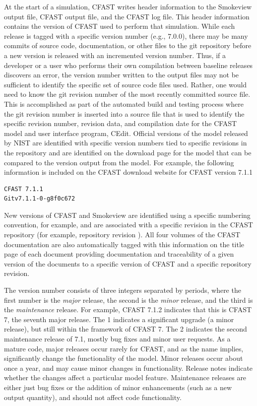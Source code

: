 \documentclass[12pt]{book}
\begin{document}
At the start of a simulation, CFAST writes header information to the Smokeview output file, CFAST output file, and the CFAST log file.  This header information contains the version of CFAST used to perform that simulation. While each release is tagged with a specific version number (e.g., 7.0.0), there may be many commits of source code, documentation, or other files to the git repository before a new version is released with an incremented version number.  Thus, if a developer or a user who performs their own compilation between baseline releases discovers an error, the version number written to the output files may not be sufficient to identify the specific set of source code files used.  Rather, one would need to know the git revision number of the most recently committed source file. This is accomplished as part of the automated build and testing process where the git revision number is inserted into a source file that is used to identify the specific revision number, revision data, and compilation date for the CFAST model and user interface program, CEdit. Official versions of the model released by NIST are identified with specific version numbers tied to specific revisions in the repository and are identified on the download page for the model that can be compared to the version output from the model. For example, the following information is included on the CFAST download website for CFAST version 7.1.1

\begin{lstlisting}
CFAST 7.1.1
Gitv7.1.1-0-g8f0c672
\end{lstlisting}

New versions of CFAST and Smokeview are identified using a specific numbering convention, for example,  and are associated with a specific revision in the CFAST repository (for example, repository revision ). All four volumes of the CFAST documentation are also automatically tagged with this information on the title page of each document providing documentation and traceability of a given version of the documents to a specific version of CFAST and a specific repository revision.

The version number consists of three integers separated by periods, where the first number is the {\em major} release, the second is the {\em minor} release, and the third is the {\em maintenance} release.   For example, CFAST 7.1.2 indicates that this is CFAST 7, the seventh major release. The 1 indicates a significant upgrade (a minor release), but still within the framework of CFAST 7.  The 2 indicates the second maintenance release of 7.1, mostly bug fixes and minor user requests. As a mature code, major releases occur rarely for CFAST, and as the name implies, significantly change the functionality of the model. Minor releases occur about once a year, and may cause minor changes in functionality. Release notes indicate whether the changes affect a particular model feature. Maintenance releases are either just bug fixes or the addition of minor enhancements (such as a new output quantity), and should not affect code functionality.
\end{document}
